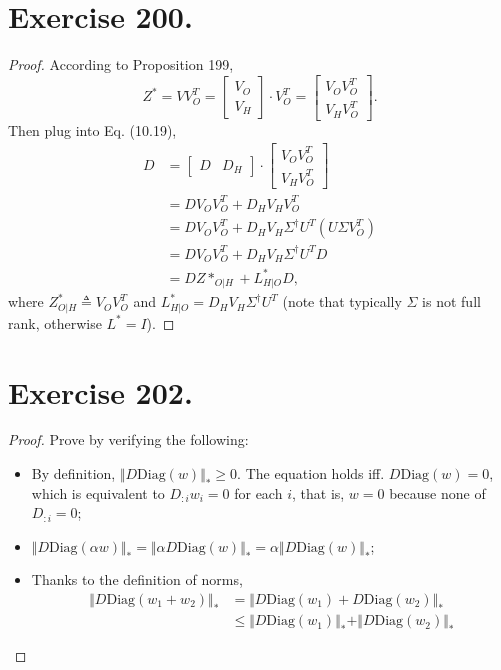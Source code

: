 \documentclass{article}
\begin{document}
\section{Exercise 200.}
\begin{proof}
According to Proposition 199,
$$
Z^{*} = VV_O^{T}= \begin{bmatrix}
    V_O \\
    V_H
    \end{bmatrix} \cdot V_O^{T} =  \begin{bmatrix}
    V_OV_O^{T} \\
    V_HV_O^{T}
    \end{bmatrix}.
$$
Then plug into Eq. (10.19),
\begin{align*}
    D &= 
    \begin{bmatrix}
    D & D_H
    \end{bmatrix} \cdot
    \begin{bmatrix}
    V_OV_O^{T} \\
    V_HV_O^{T}
    \end{bmatrix} \\
    &= DV_OV_O^{T} + D_HV_HV_O^{T} \\
    &= DV_OV_O^{T} + D_HV_H \Sigma^{\dag} U^{T} (U \Sigma V_O^{T}) \\
    &= DV_OV_O^{T} + D_HV_H \Sigma^{\dag} U^{T} D \\
    & = DZ*_{O\vert H} + L^{*}_{H\vert O}D,
\end{align*}
where $Z^*_{O\vert H} \triangleq V_OV_O^{T}$ and $L^{*}_{H\vert O} = D_HV_H \Sigma^{\dag} U^{T}$ (note that typically $\Sigma$ is not full rank, otherwise $L^{*} = I$).
\end{proof}

\section{Exercise 202.}
\begin{proof}
Prove by verifying the following:
\begin{itemize}
\item By definition, $\Vert D \text{Diag}(w) \Vert_{*} \geq 0$. The equation holds iff. $D\text{Diag}(w) = 0$, which is equivalent to $D_{:i}w_i = 0$ for each $i$, that is, $w = 0$ because none of $D_{:i} = 0$;
\item $\Vert D \text{Diag}(\alpha w) \Vert_{*}= \Vert \alpha D \text{Diag}( w) \Vert_{*} =  \alpha \Vert D \text{Diag}( w) \Vert_{*}$;
\item Thanks to the definition of norms,
\begin{align*}
    \Vert D \text{Diag}(w_1 + w_2) \Vert_{*} & = \Vert D \text{Diag}(w_1) + D \text{Diag}(w_2) \Vert_{*} \\
                                             & \leq \Vert D \text{Diag}(w_1)\Vert_{*} + \Vert D \text{Diag}(w_2) \Vert_{*}
\end{align*}
\end{itemize}
\end{proof}
\end{document}
